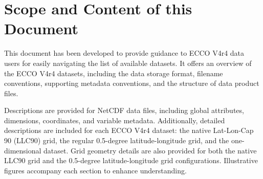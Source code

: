 \pagebreak
\section{Scope and Content of this Document}

\par This document has been developed to provide guidance to ECCO V4r4 data users for easily navigating the list of available datasets. It offers an overview of the ECCO V4r4 datasets, including the data storage format, filename conventions, supporting metadata conventions, and the structure of data product files.

\par Descriptions are provided for NetCDF data files, including global attributes, dimensions, coordinates, and variable metadata. Additionally, detailed descriptions are included for each ECCO V4r4 dataset: the native Lat-Lon-Cap 90 (LLC90) grid, the regular 0.5-degree latitude-longitude grid, and the one-dimensional dataset. Grid geometry details are also provided for both the native LLC90 grid and the 0.5-degree latitude-longitude grid configurations. Illustrative figures accompany each section to enhance understanding.


